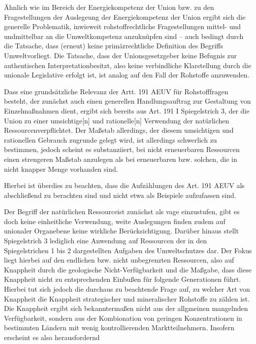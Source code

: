 \documentclass[12pt,a4paper,oneside]{book} %
\begin{document}
Ähnlich wie im Bereich der Energiekompetenz der Union bzw. zu den Fragestellungen der Auslegeung der Energiekompetenz der Union ergibt sich die generelle Problematik, inwieweit rohstoffrechtliche Fragestellungen mittel- und undmittelbar an die Umweltkompetenz anzuknüpfen sind -- auch bedingt durch die Tatsache, dass (erneut) keine primärrechtliche Definition des Begriffs \glqq Umwelt\grqq vorliegt. Die Tatsache, dass der Unionsgesetzgeber \glqq keine Befugnis zur authentischen Interpretation\grqq besitzt,\autocite{Grabitz Hilf Nettesheim, Art. 191 Rn. 49} also keine verbindliche Klarstellung durch die unionale Legislative erfolgt ist,  ist analog auf den Fall der Rohstoffe anzuwenden.
	
Dass eine grundsätzliche Relevanz der Artt. 191 AEUV für Rohstofffragen besteht, der zunächst auch einen generellen Handlungsauftrag zur Gestaltung von Einzelmaßnahmen dient,\autocite{Grabitz Hilf Nettesheim, Art. 191 Rn. 58} ergibt sich bereits aus Art. 191 I Spiegelstrich 3, der die Union zu einer \glqq umsichtige[n] und rationelle[n] Verwendung der natürlichen Ressourcen\glqq verpflichtet. Der Maßstab allerdings, der diesem umsichtigen und rationellen Gebrauch zugrunde gelegt wird, ist allerdings schwerlich zu bestimmen, jedoch scheint es substanziiert, bei nicht erneuerbaren Ressourcen einen strengeren Maßstab anzulegen als bei erneuerbaren bzw. solchen, die in nicht knapper Menge vorhanden sind.\autocite{Callies/ruffert EUv AEUV, Art. 191 AEUv Rn. 12}
	
Hierbei ist überdies zu beachten, dass die Aufzählungen des Art. 191 AEUV als abschließend zu berachten sind und nicht etwa als Beispiele aufzufassen sind.\autocite{Grabitz Hilf Nettesheim, Art. 191 Rn. 62} 
	
Der Begriff der \glqq natürlichen Ressource\grqq ist zunächst als vage einzustufen, gibt es doch keine einheitliche Verwendung, weite Auslegungen finden zudem auf unionaler Organebene keine wirkliche Berücksichtigung. \autocite{von der Groeben/Schwarze/Hatje, AEUV Art. 191. Rn. 28} Darüber hinaus stellt Spiegelstrich 3 lediglich eine Anwendung auf Ressourcen der in den Spiegelstrichen 1 bis 2 dargestellten Aufgaben des Umweltschutzes dar.\autocite{Grabitz Hilf Nettesheim, Art. 191 Rn. 75} Der Fokus liegt hierbei auf den endlichen bzw. nicht unbegrenzten Ressourcen, also auf Knappheit durch die geologische Nicht-Verfügbarkeit und die Maßgabe, dass diese Knappheit nicht zu entsprechenden Einbußen für folgende Generationen führt.\autocite{Grabitz Hilf Nettesheim, Art. 191 Rn. 76} Hierbei tut sich jedoch die durchaus zu beachtende Frage auf, zu welcher Art von Knappheit die Knappheit strategischer und mineralischer Rohstoffe zu zählen ist. Die Knappheit ergibt sich bekanntermaßen nicht aus der allgmeinen mangelnden Verfügbarkeit, sondern aus der Kombionation von geringen Konzentrationen in bestimmten Ländern mit wenig kontrollierenden Marktteilnehmern. Insofern erscheint es also herausfordernd
\end{document}
